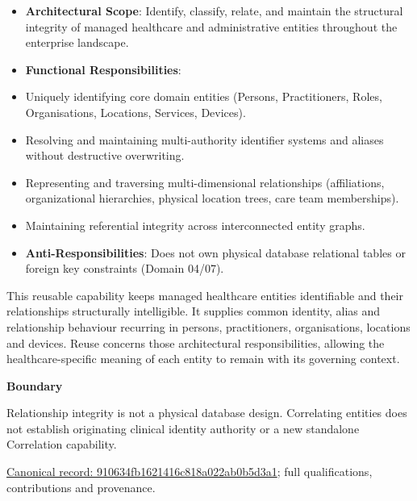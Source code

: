 \begin{itemize}


\item \textbf{Architectural Scope}: Identify, classify, relate, and maintain the structural integrity of managed healthcare and administrative entities throughout the enterprise landscape.

\item \textbf{Functional Responsibilities}:

\item Uniquely identifying core domain entities (Persons, Practitioners, Roles, Organisations, Locations, Services, Devices).

\item Resolving and maintaining multi-authority identifier systems and aliases without destructive overwriting.

\item Representing and traversing multi-dimensional relationships (affiliations, organizational hierarchies, physical location trees, care team memberships).

\item Maintaining referential integrity across interconnected entity graphs.

\item \textbf{Anti-Responsibilities}: Does not own physical database relational tables or foreign key constraints (Domain 04/07).

\end{itemize}


This reusable capability keeps managed healthcare entities identifiable and their relationships structurally intelligible. It supplies common identity, alias and relationship behaviour recurring in persons, practitioners, organisations, locations and devices. Reuse concerns those architectural responsibilities, allowing the healthcare-specific meaning of each entity to remain with its governing context.



\textbf{Boundary}



Relationship integrity is not a physical database design. Correlating entities does not establish originating clinical identity authority or a new standalone Correlation capability.


{\footnotesize \href{../../../../continuum/strategy/capability/910634fb1621416c818a022ab0b5d3a1.md}{Canonical record: 910634fb1621416c818a022ab0b5d3a1}; full qualifications, contributions and provenance.}\par
